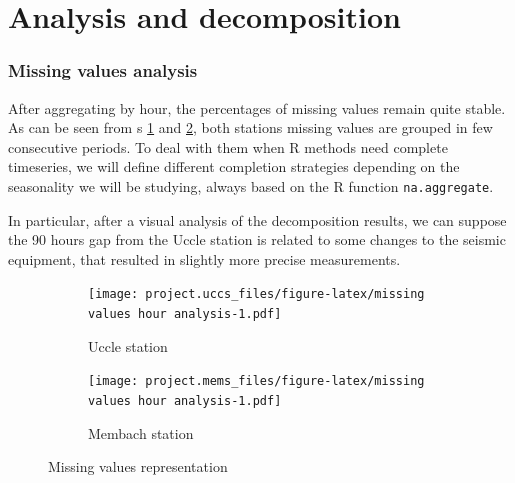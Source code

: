 \documentclass[12pt]{article}
\begin{document}
\section{Analysis and decomposition}
\subsubsection{Missing values analysis}



After aggregating by hour, the percentages of missing values remain quite stable. As can be seen from \figurename{s} \ref{missing-values-seconds:uccs} and \ref{missing-values-seconds:mems}, both stations missing values are grouped in few consecutive periods.
To deal with them when R methods need complete timeseries, we will define different completion strategies depending on the seasonality we will be studying, always based on the R function \texttt{na.aggregate}.

In particular, after a visual analysis of the decomposition results, we can suppose the 90 hours gap from the Uccle station is related to some changes to the seismic equipment, that resulted in slightly more precise measurements.

\begin{figure}[h]
	\begin{subfigure}{.5\linewidth}
		\texttt{[image: project.uccs\_files/figure-latex/missing values hour analysis-1.pdf]}
		\caption{Uccle station}
		\label{missing-values-seconds:uccs}
	\end{subfigure}
	\begin{subfigure}{.5\linewidth}
		\texttt{[image: project.mems\_files/figure-latex/missing values hour analysis-1.pdf]}
		\caption{Membach station}
		\label{missing-values-seconds:mems}
	\end{subfigure}
	\caption{Missing values representation}
	\label{missing-values-seconds}
\end{figure}
\end{document}
